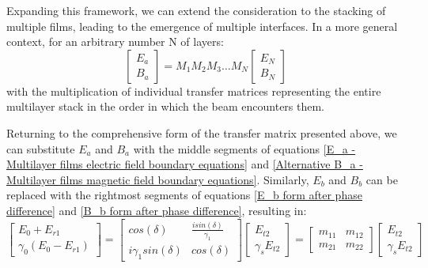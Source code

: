 Expanding this framework, we can extend the consideration to the stacking of multiple films, leading to the emergence of multiple interfaces. In a more general context, for an arbitrary number N of layers: %
    \[
      \begin{bmatrix}
        E_a  \\
        B_a
      \end{bmatrix} = 
            M_1M_2M_3\hdots M_N
            \begin{bmatrix}
            E_N \\
            B_N
          \end{bmatrix}
    \]
with the multiplication of individual transfer matrices representing the entire multilayer stack in the order in which the beam encounters them.

Returning to the comprehensive form of the transfer matrix presented above, we can substitute $E_a$ and $B_a$ with the middle segments of equations \ref{E_a - Multilayer films electric field boundary equations} and \ref{Alternative B_a - Multilayer films magnetic field boundary equations}. Similarly, $E_b$ and $B_b$ can be replaced with the rightmost segments of equations \ref{E_b form after phase difference} and \ref{B_b form after phase difference}, resulting in: %
    \[
      \begin{bmatrix}
        E_0 + E_{r1}  \\
        \gamma_0(E_0 - E_{r1})
      \end{bmatrix} = 
            \begin{bmatrix}
            cos(\delta) & \frac{isin(\delta)}{\gamma_1} \\
            i\gamma_1sin(\delta) & cos(\delta)
            \end{bmatrix}
            \begin{bmatrix}
            E_{t2}  \\
            \gamma_sE_{t2}
          \end{bmatrix} =
                \begin{bmatrix}
                    m_{11} & m_{12} \\
                    m_{21} & m_{22}
                \end{bmatrix}
                \begin{bmatrix}
                    E_{t2} \\
                    \gamma_sE_{t2}
                  \end{bmatrix}
    \]

